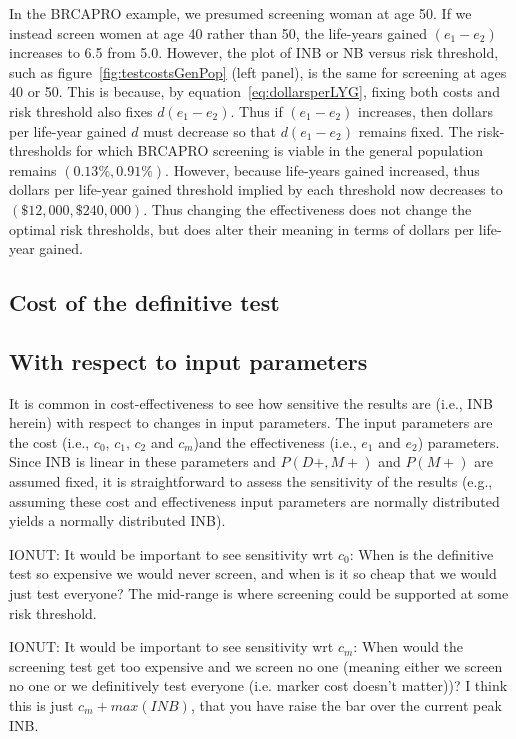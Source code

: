 \documentclass[11pt, letterpaper]{article}
\begin{document}
In the BRCAPRO example, we presumed screening woman at age 50.  If we instead screen women at age 40 rather than 50, the life-years gained $(e_1-e_2)$ increases to 6.5 from 5.0.  However, the plot of INB or NB versus risk threshold, such as figure~\ref{fig:testcostsGenPop} (left panel), is the same for screening at ages 40 or 50.  This is because, by equation~\ref{eq:dollarsperLYG}, fixing both costs and risk threshold also fixes $d(e_1-e_2)$.  Thus if $(e_1-e_2)$ increases, then dollars per life-year gained $d$ must decrease so that $d(e_1-e_2)$ remains fixed.  The risk-thresholds for which BRCAPRO screening is viable in the general population remains $(0.13\%,0.91\%)$.   However, because life-years gained increased, thus dollars per life-year gained threshold implied by each threshold now decreases to $(\$12,\!000,\$240,\!000)$.  Thus changing the effectiveness does not change the optimal risk thresholds, but does alter their meaning in terms of dollars per life-year gained.

\subsection{Cost of the definitive test}
\label{sec:SensitivityC0}




\subsection{With respect to input parameters}

It is common in cost-effectiveness to see how sensitive the results are (i.e., INB herein) with respect to changes in input parameters. The input parameters are the cost (i.e., $c_0$, $c_1$, $c_2$ and $c_m$)and the effectiveness (i.e., $e_1$ and $e_2$) parameters. Since INB is linear in these parameters and $P(D+,M+)$ and $P(M+)$ are assumed fixed, it is straightforward to assess the sensitivity of the results (e.g., assuming these cost and effectiveness input parameters are normally distributed yields a normally distributed INB).

IONUT: It would be important to see sensitivity wrt $c_0$:  When is the definitive test so expensive we would never screen, and when is it so cheap that we would just test everyone?  The mid-range is where screening could be supported at some risk threshold.

IONUT: It would be important to see sensitivity wrt $c_m$:  When would the screening test get too expensive and we screen no one (meaning either we screen no one or we definitively test everyone (i.e. marker cost doesn't matter))?  I think this is just $c_m+max(INB)$, that you have raise the bar over the current peak INB.  
\end{document}
